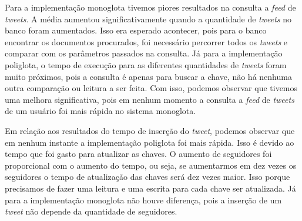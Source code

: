 Para a implementação monoglota tivemos piores resultados na consulta a \textit{feed} de \textit{tweets}. A média aumentou significativamente quando a quantidade de \textit{tweets} no banco foram aumentados. Isso era esperado acontecer, pois para o banco encontrar os documentos procurados, foi necessário percorrer todos os \textit{tweets} e comparar com os parâmetros passados na consulta.
Já para a implementação poliglota, o tempo de execução para as diferentes quantidades de \textit{tweets} foram muito próximos, pois a consulta é apenas para buscar a chave, não há nenhuma outra comparação ou leitura a ser feita.
Com isso, podemos observar que tivemos uma melhora significativa, pois em nenhum momento a consulta a \textit{feed} de \textit{tweets} de um usuário foi mais rápida no sistema monoglota.

Em relação aos resultados do tempo de inserção do \textit{tweet}, podemos observar que em nenhum instante a implementação poliglota foi mais rápida. Isso é devido ao tempo que foi gasto para atualizar as chaves. O aumento de seguidores foi proporcional com o aumento do tempo, ou seja, se aumentarmos em dez vezes os seguidores o tempo de atualização das chaves será dez vezes maior.
Isso porque precisamos de fazer uma leitura e uma escrita para cada chave ser atualizada. Já para a implementação monoglota não houve diferença, pois a inserção de um \textit{tweet} não depende da quantidade de seguidores.


